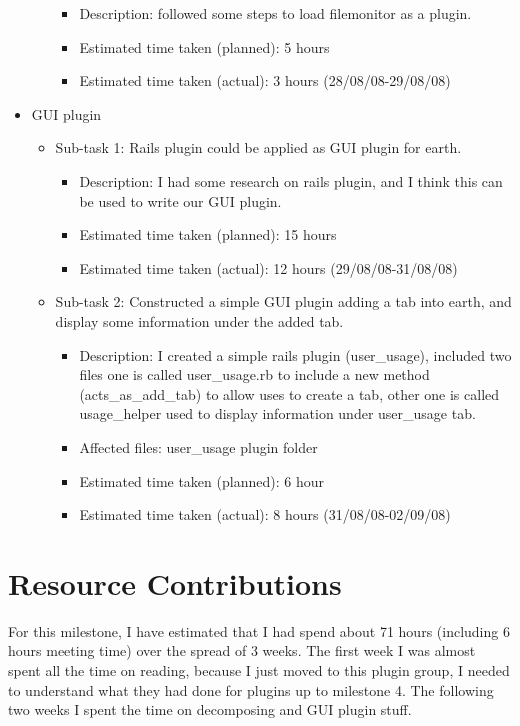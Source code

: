 \documentclass{article}
\begin{document}
\begin{itemize}
\begin{itemize}
\begin{itemize}
					\item Description: followed some steps to load filemonitor as a plugin.
					\item Estimated time taken (planned): 5 hours
					\item Estimated time taken (actual): 3 hours (28/08/08-29/08/08)
				\end{itemize}	
	     \end{itemize}
	\item GUI plugin
	     \begin{itemize}
	         \item Sub-task 1: Rails plugin could be applied as GUI plugin for earth.
	            \begin{itemize}
	              \item Description: I had some research on rails plugin, and I think this can be used to write our GUI plugin.
					\item Estimated time taken (planned): 15 hours
					\item Estimated time taken (actual): 12 hours (29/08/08-31/08/08)
				 \end{itemize}
	         \item Sub-task 2: Constructed a simple GUI plugin adding a tab into earth, and display some information under the added tab.
	            \begin{itemize}
				    \item Description: I created a simple rails plugin (user\_usage), included two files one is called user\_usage.rb to include a new method (acts\_as\_add\_tab) to allow uses to create a tab, other one is called usage\_helper used to display information under user\_usage tab.
					\item Affected files: user\_usage plugin folder
					\item Estimated time taken (planned): 6 hour
					\item Estimated time taken (actual): 8 hours (31/08/08-02/09/08)
				 \end{itemize}
	     \end{itemize}
\end{itemize}

\section*{Resource Contributions}

For this milestone, I have estimated that I had spend about 71 hours (including 6 hours meeting time) over the spread of 3 weeks. The first week I was almost spent all the time on reading, because I just moved to this plugin group, I needed to understand what they had done for plugins up to milestone 4. The following two weeks I spent the time on decomposing and GUI plugin stuff.
\end{document}
